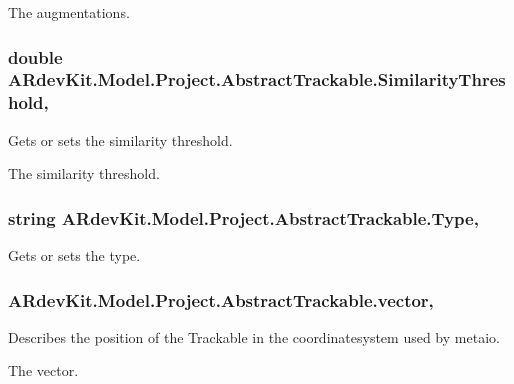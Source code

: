 The augmentations. \hypertarget{class_a_rdev_kit_1_1_model_1_1_project_1_1_abstract_trackable_af77b1f7a449ef9150e22c684894213b1}{
\subsubsection[{Similarity\-Threshold}]{\setlength{\rightskip}{0pt plus 5cm}double A\-Rdev\-Kit.\-Model.\-Project.\-Abstract\-Trackable.\-Similarity\-Threshold\hspace{0.3cm}{\ttfamily [get]}, {\ttfamily [set]}}}\label{class_a_rdev_kit_1_1_model_1_1_project_1_1_abstract_trackable_af77b1f7a449ef9150e22c684894213b1}


Gets or sets the similarity threshold. 

The similarity threshold. \hypertarget{class_a_rdev_kit_1_1_model_1_1_project_1_1_abstract_trackable_ab55c05790e5ffbefc7351a91167427bc}{
\subsubsection[{Type}]{\setlength{\rightskip}{0pt plus 5cm}string A\-Rdev\-Kit.\-Model.\-Project.\-Abstract\-Trackable.\-Type\hspace{0.3cm}{\ttfamily [get]}, {\ttfamily [set]}}}\label{class_a_rdev_kit_1_1_model_1_1_project_1_1_abstract_trackable_ab55c05790e5ffbefc7351a91167427bc}


Gets or sets the type. 

\hypertarget{class_a_rdev_kit_1_1_model_1_1_project_1_1_abstract_trackable_a1a8b6d43d95fad1720fc5af98b7e42b4}{
\subsubsection[{vector}]{ A\-Rdev\-Kit.\-Model.\-Project.\-Abstract\-Trackable.\-vector\hspace{0.3cm}{\ttfamily [get]}, {\ttfamily [set]}}}\label{class_a_rdev_kit_1_1_model_1_1_project_1_1_abstract_trackable_a1a8b6d43d95fad1720fc5af98b7e42b4}


Describes the position of the Trackable in the coordinatesystem used by metaio. 

The vector. 